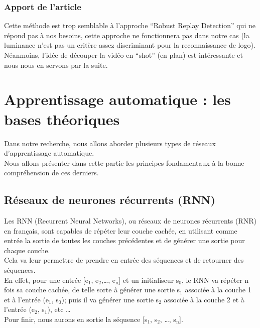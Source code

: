 \documentclass[11pt]{article}
\begin{document}
\subsubsection{Apport de l'article}
\label{sec:org4d1a79c}
Cette méthode est trop semblable à l’approche “Robust Replay Detection” qui ne répond pas à nos besoins, cette approche ne fonctionnera pas dans notre cas (la luminance n’est pas un critère assez discriminant pour la reconnaissance de logo).\\
Néanmoins, l’idée de découper la vidéo en “shot” (en plan) est intéressante et nous nous en servons par la suite.\\

\newpage
\section{Apprentissage automatique : les bases théoriques}
\label{sec:orgfa11581}
Dans notre recherche, nous allons aborder plusieurs types de réseaux d'apprentissage automatique.\\
Nous allons présenter dans cette partie les principes fondamentaux à la bonne compréhension de ces derniers.\\

\subsection{Réseaux de neurones récurrents (RNN)}
\label{sec:org1eaf634}
Les RNN (Recurrent Neural Networks), ou réseaux de neurones récurrents (RNR) en français, sont capables de répéter leur couche cachée, en utilisant comme entrée la sortie de toutes les couches précédentes et de générer une sortie pour chaque couche.\\
Cela va leur permettre de prendre en entrée des séquences et de retourner des séquences.\\
En effet, pour une entrée [e\(_{\text{1}}\), e\(_{\text{2}}\),\ldots{}, e\(_{\text{n}}\)] et un initialiseur s\(_{\text{0}}\), le RNN va répéter n fois sa couche cachée, de telle sorte à générer une sortie s\(_{\text{1}}\) associée à la couche 1 et à l'entrée (e\(_{\text{1}}\), s\(_{\text{0}}\)); puis il va générer une sortie s\(_{\text{2}}\) associée à la couche 2 et à l'entrée (e\(_{\text{2}}\), s\(_{\text{1}}\)), etc \ldots{}\\
Pour finir, nous aurons en sortie la séquence [s\(_{\text{1}}\), s\(_{\text{2}}\), \ldots{}, s\(_{\text{n}}\)].\\
\end{document}

